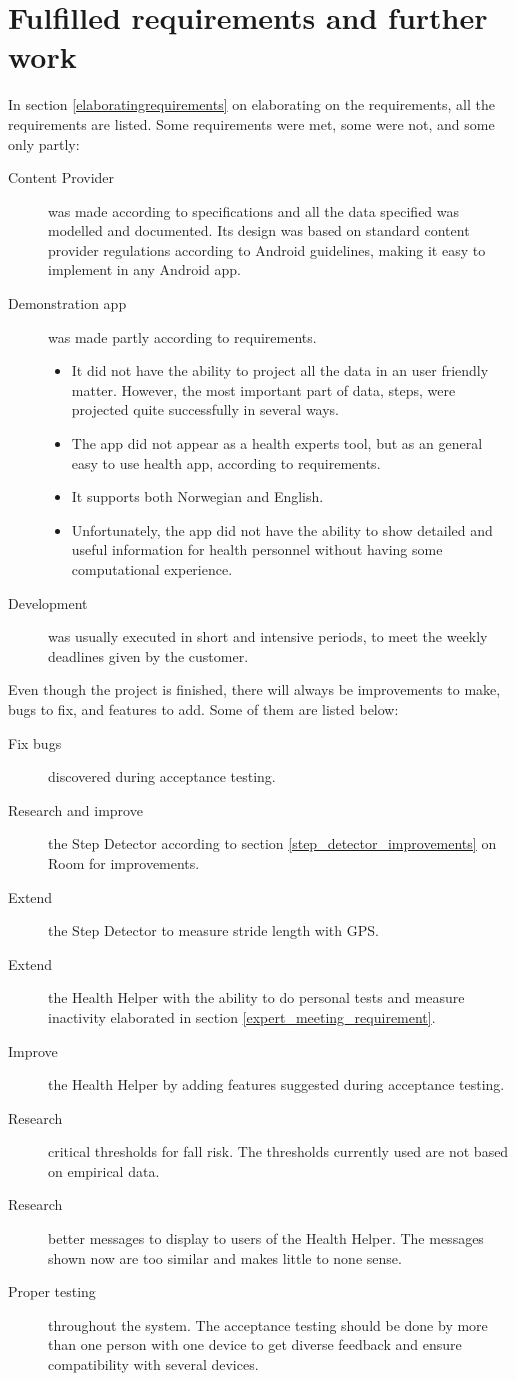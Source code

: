 \section{Fulfilled requirements and further work}
In section \ref{elaboratingrequirements} on elaborating on the requirements, all the requirements are listed. Some requirements were met, some were not, and some only partly:
\begin{description}
\item[Content Provider] was made according to specifications and all the data specified was modelled and documented. Its design was based on standard content provider regulations according to Android guidelines, making it easy to implement in any Android app.
\item[Demonstration app] was made partly according to requirements.
\begin{itemize}
\item It did not have the ability to project all the data in an user friendly matter. However, the most important part of data, steps, were projected quite successfully in several ways.
\item The app did not appear as a health experts tool, but as an general easy to use health app, according to requirements.
\item It supports both Norwegian and English.
\item Unfortunately, the app did not have the ability to show detailed and useful information for health personnel without having some computational experience.
\end{itemize} 
\item[Development] was usually executed in short and intensive periods, to meet the weekly deadlines given by the customer.
\end{description}
Even though the project is finished, there will always be improvements to make, bugs to fix, and features to add. Some of them are listed below:
\begin{description}
\item[Fix bugs] discovered during acceptance testing.
\item[Research and improve] the Step Detector according to section \ref{step_detector_improvements} on Room for improvements. 
\item[Extend] the Step Detector to measure stride length with GPS.
\item[Extend] the Health Helper with the ability to do personal tests and measure inactivity elaborated in section \ref{expert_meeting_requirement}.
\item[Improve] the Health Helper by adding features suggested during acceptance testing.
\item[Research] critical thresholds for fall risk. The thresholds currently used are not based on empirical data.
\item[Research] better messages to display to users of the Health Helper. The messages shown now are too similar and makes little to none sense.
\item[Proper testing] throughout the system. The acceptance testing should be done by more than one person with one device to get diverse feedback and ensure compatibility with several devices.
\end{description}
